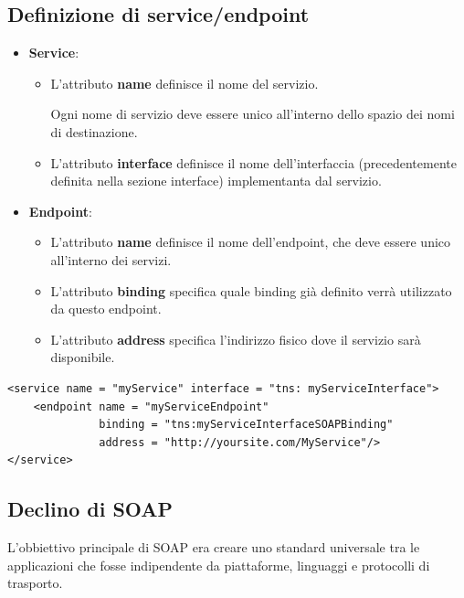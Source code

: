 \subsection{Definizione di service/endpoint}
\begin{itemize}
    \item \textbf{Service}:
    \begin{itemize}
        \item L'attributo \textbf{name} definisce il nome del servizio.

        Ogni nome di servizio deve essere unico all'interno dello spazio dei nomi di destinazione.
        \item L'attributo \textbf{interface} definisce il nome dell'interfaccia (precedentemente definita nella sezione interface) implementanta dal servizio.
    \end{itemize}
    \item \textbf{Endpoint}:
    \begin{itemize}
        \item L'attributo \textbf{name} definisce il nome dell'endpoint, che deve essere unico all'interno dei servizi.
        \item L'attributo \textbf{binding} specifica quale binding già definito verrà utilizzato da questo endpoint.
        \item L'attributo \textbf{address} specifica l'indirizzo fisico dove il servizio sarà disponibile.
    \end{itemize}
\end{itemize}
\begin{tcolorbox}[breakable, title={Esempio di service/endpoint}]
    \begin{lstlisting}
<service name = "myService" interface = "tns: myServiceInterface">
    <endpoint name = "myServiceEndpoint"
              binding = "tns:myServiceInterfaceSOAPBinding"
              address = "http://yoursite.com/MyService"/>
</service>
    \end{lstlisting}
\end{tcolorbox}

\subsection{Declino di SOAP}
L'obbiettivo principale di SOAP era creare uno standard universale tra le applicazioni che fosse indipendente da piattaforme, linguaggi e protocolli di trasporto.

